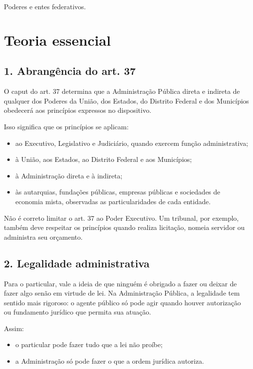 \documentclass[11pt,a4paper]{article}
\begin{document}
   Poderes e entes federativos.

\section*{Teoria essencial}

\subsection*{1. Abrangência do art. 37}

O caput do art. 37 determina que a Administração Pública direta e indireta de qualquer dos Poderes da União, dos Estados, do Distrito Federal e dos Municípios obedecerá aos princípios expressos no dispositivo.

Isso significa que os princípios se aplicam:

\begin{itemize}
  \item ao Executivo, Legislativo e Judiciário, quando exercem função administrativa;
  \item à União, aos Estados, ao Distrito Federal e aos Municípios;
  \item à Administração direta e à indireta;
  \item às autarquias, fundações públicas, empresas públicas e sociedades de economia mista, observadas as particularidades de cada entidade.
\end{itemize}

Não é correto limitar o art. 37 ao Poder Executivo. Um tribunal, por exemplo, também deve respeitar os princípios quando realiza licitação, nomeia servidor ou administra seu orçamento.

\subsection*{2. Legalidade administrativa}

Para o particular, vale a ideia de que ninguém é obrigado a fazer ou deixar de fazer algo senão em virtude de lei. Na Administração Pública, a legalidade tem sentido mais rigoroso: o agente público só pode agir quando houver autorização ou fundamento jurídico que permita sua atuação.

Assim:

\begin{itemize}
  \item o particular pode fazer tudo que a lei não proíbe;
  \item a Administração só pode fazer o que a ordem jurídica autoriza.
\end{itemize}
\end{document}
